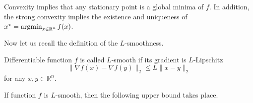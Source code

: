 Convexity implies that any stationary point is a global minima of $f$. In addition, the strong convexity implies the existence and uniqueness of $x^\star = \operatorname*{argmin}_{x\in\mathbb{R}^n} f(x)$.

Now let us recall the definition of the $L$-smoothness. 

\begin{definition}[$L$-smoothness]
Differentiable function $f$ is called $L$-smooth if its gradient is $L$-Lipschitz
\begin{equation}
    \|\nabla f(x) - \nabla f(y)\|_2\leq L\|x-y\|_2
\end{equation}
for any $x,y\in\mathbb{R}^n$.
\end{definition}

If function $f$ is $L$-smooth, then the following upper bound takes place.


